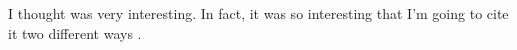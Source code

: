 \documentclass{article}
\begin{document}
I thought \cite{mckeague2015adaptive} was very interesting. In fact, it was so interesting that I'm going to cite it two different ways \citep{mckeague2015adaptive}.


\end{document}
